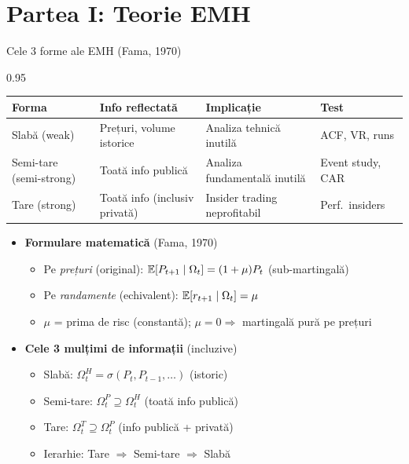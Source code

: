 \documentclass[9pt, aspectratio=169, t]{beamer}
\begin{document}
\section{Partea I: Teorie EMH}

\begin{frame}[shrink=15]{Cele 3 forme ale EMH (Fama, 1970)}
\begin{cminipage}{0.95\textwidth}
\small
\renewcommand{\arraystretch}{1.2}
\begin{center}
\begin{tabular}{llll}
\toprule
\textbf{Forma} & \textbf{Info reflectată} & \textbf{Implicație} & \textbf{Test} \\
\midrule
Slabă (weak) & Prețuri, volume istorice & Analiza tehnică inutilă & ACF, VR, runs \\
Semi-tare (semi-strong) & Toată info publică & Analiza fundamentală inutilă & Event study, CAR \\
Tare (strong) & Toată info (inclusiv privată) & Insider trading neprofitabil & Perf.\ insiders \\
\bottomrule
\end{tabular}
\end{center}

\vspace{0.2cm}
\begin{itemize}\setlength{\itemsep}{0pt}
    \item \textbf{Formulare matematică} (Fama, 1970)
    \begin{itemize}\setlength{\itemsep}{0pt}
        \item Pe \emph{prețuri} (original): $\mathbb{E}[P_{t+1} \mid \Omega_t] = (1+\mu) P_t$ (sub-martingală)
        \item Pe \emph{randamente} (echivalent): $\mathbb{E}[r_{t+1} \mid \Omega_t] = \mu$
        \item $\mu$ = prima de risc (constantă); $\mu = 0 \Rightarrow$ martingală pură pe prețuri
    \end{itemize}
    \item \textbf{Cele 3 mulțimi de informații} (incluzive)
    \begin{itemize}\setlength{\itemsep}{0pt}
        \item Slabă: $\Omega_t^{H} = \sigma(P_t, P_{t-1}, \ldots)$ (istoric)
        \item Semi-tare: $\Omega_t^{P} \supseteq \Omega_t^{H}$ (toată info publică)
        \item Tare: $\Omega_t^{T} \supseteq \Omega_t^{P}$ (info publică + privată)
        \item Ierarhie: Tare $\Rightarrow$ Semi-tare $\Rightarrow$ Slabă
    \end{itemize}
\end{itemize}
\end{cminipage}
\end{frame}
\end{document}
